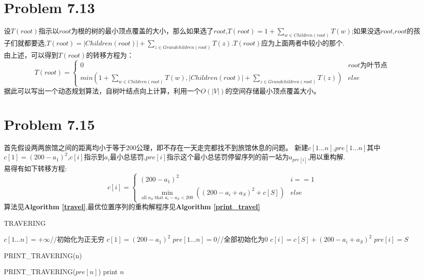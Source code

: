 \documentclass[onecolumn]{ctexart}
\begin{document}
\section*{Problem 7.13}
\indent 设$T(root)$指示以$root$为根的树的最小顶点覆盖的大小，那么如果选了$root$,$T(root)=1+\sum\limits_{w\in Children(root)}T(w)$;如果没选$root$,$root$的孩子们就都要选,$T(root)=|Children(root)|+\sum\limits_{z\in Grandchildren(root)}T(z)$.$T(root)$应为上面两者中较小的那个.\\
\indent 由上述，可以得到$T(root)$的转移方程为：\\
$$
T(root)=
\begin{cases}
0		& root\text{为叶节点}\\
min(1+\sum\limits_{w\in Children(root)}T(w),|Children(root)|+\sum\limits_{z\in Grandchildren(root)}T(z))		&else
\end{cases}
$$
\indent 据此可以写出一个动态规划算法，自树叶结点向上计算，利用一个$O(|V|)$的空间存储最小顶点覆盖大小。\\

\section*{Problem 7.15}
\indent 首先假设两两旅馆之间的距离均小于等于200公理，即不存在一天走完都找不到旅馆休息的问题。
\indent 新建$c[1...n]$,$pre[1...n]$其中$c[1]=(200-a_1)^2$,$c[i]$指示到$a_i$最小总惩罚,$pre[i]$指示这个最小总惩罚停留序列的前一站为$a_{pre[i]}$,用以重构解.\\
\indent 易得有如下转移方程:
$$
c[i]=
\begin{cases}
(200-a_1)^2 & i==1\\
\min \limits_{\text{all $a_S$ that }a_i-a_S<200} \left((200-a_i+a_S)^2+c[S] \right) & else
\end{cases}
$$
\indent 算法见\textbf{Algorithm \ref{travel}},最优位置序列的重构解程序见\textbf{Algorithm \ref{print_travel}}
\begin{algorithm}[htbp]
	\caption{TRAVERING}
	\label{travel}
	\begin{algorithmic}[1]
		\STATE $c[1...n]={+\infty}$//初始化为正无穷
		\STATE $c[1]=(200-a_1)^2$
		\STATE $pre[1...n]={0}$//全部初始化为0
					\STATE $c[i]=c[S]+(200-a_i+a_S)^2$
					\STATE $pre[i]=S$
				\ENDIF
			\ENDFOR
		\ENDFOR
	\end{algorithmic}
\end{algorithm}

\begin{algorithm}[htbp]
	\caption{PRINT\_TRAVERING(n)}
	\label{print_travel}
	\begin{algorithmic}[1]
		\STATE PRINT\_TRAVERING($pre[n]$)
		\STATE print $n$
	\ENDIF
	\end{algorithmic}
\end{algorithm}
\end{document}
